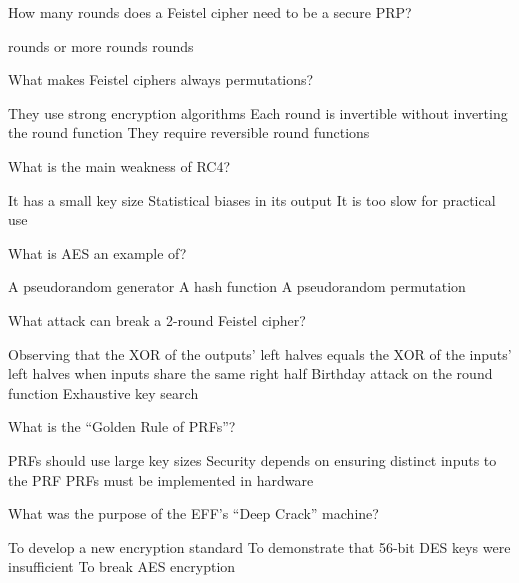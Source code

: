 \documentclass[10pt,a4paper,american]{exam}
\begin{document}
\begin{questions}
	\question How many rounds does a Feistel cipher need to be a secure PRP?
	\begin{randomizechoices}
		 rounds
		 or more rounds
		 rounds
	\end{randomizechoices}

	\question What makes Feistel ciphers always permutations?
	\begin{randomizechoices}
		\choice They use strong encryption algorithms
		\CorrectChoice Each round is invertible without inverting the round function
		\choice They require reversible round functions
	\end{randomizechoices}

	\question What is the main weakness of RC4?
	\begin{randomizechoices}
		\choice It has a small key size
		\CorrectChoice Statistical biases in its output
		\choice It is too slow for practical use
	\end{randomizechoices}

	\question What is AES an example of?
	\begin{randomizechoices}
		\choice A pseudorandom generator
		\choice A hash function
		\CorrectChoice A pseudorandom permutation
	\end{randomizechoices}

	\question What attack can break a 2-round Feistel cipher?
	\begin{randomizechoices}
		\CorrectChoice Observing that the XOR of the outputs' left halves equals the XOR of the inputs' left halves when inputs share the same right half
		\choice Birthday attack on the round function
		\choice Exhaustive key search
	\end{randomizechoices}

	\question What is the ``Golden Rule of PRFs''?
	\begin{randomizechoices}
		\choice PRFs should use large key sizes
		\CorrectChoice Security depends on ensuring distinct inputs to the PRF
		\choice PRFs must be implemented in hardware
	\end{randomizechoices}

	\question What was the purpose of the EFF's ``Deep Crack'' machine?
	\begin{randomizechoices}
		\choice To develop a new encryption standard
		\CorrectChoice To demonstrate that 56-bit DES keys were insufficient
		\choice To break AES encryption
	\end{randomizechoices}


\end{questions}
\end{document}
